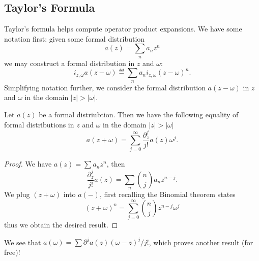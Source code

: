 \subsection{Taylor's Formula}

\M
Taylor's formula helps compute operator product expansions. We have some
notation first: given some formal distribution 
\begin{equation}
a(z)=\sum_{n}a_{n}z^{n}
\end{equation}
we may construct a formal distribution in $z$ and $\omega$:
\begin{equation}
i_{z,\omega}a(z-\omega)\eqdef\sum_{n} a_{n}i_{z,\omega}(z-\omega)^{n}.
\end{equation}
Simplifying notation further, we consider the formal distribution
$a(z-\omega)$ in $z$ and $\omega$ in the domain $|z|>|\omega|$.

\begin{prop}
Let $a(z)$ be a formal distriubtion. Then we have the following equality
of formal distributions in $z$ and $\omega$ in the domain $|z|>|\omega|$
\begin{equation}
a(z+\omega)=\sum^{\infty}_{j=0}\frac{\partial_{z}^{j}}{j!}a(z)\omega^{j}.
\end{equation}
\end{prop}
\begin{proof}
We have $a(z)=\sum a_{n}z^{n}$, then
\begin{equation}
\frac{\partial_{z}^{j}}{j!}a(z)=\sum_{n}\binom{n}{j}a_{n}z^{n-j}.
\end{equation}
We plug $(z+\omega)$ into $a(-)$, first recalling the Binomial theorem states
\begin{equation}
(z+\omega)^{n}=\sum^{\infty}_{j=0}\binom{n}{j}z^{n-j}\omega^{j}
\end{equation}
thus we obtain the desired result.
\end{proof}

\begin{rmk}
We see that $a(\omega)=\sum\partial^{j}a(z)(\omega-z)^{j}/j!$, which proves
another result (for free)!
\end{rmk}

